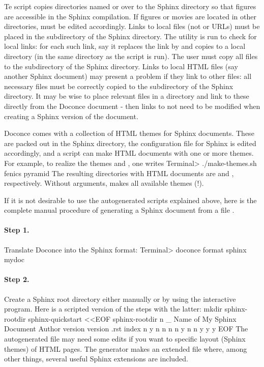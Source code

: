 \documentclass{book}
\begin{document}
Te  script copies directories named  or 
over to the Sphinx directory so that figures are accessible in the
Sphinx compilation.  If figures or movies are located in other
directories,  must be edited accordingly.
Links to local files (not  or  URLs) must be placed
in the  subdirectory of the Sphinx directory. The
utility  is run to check for local
links: for each such link, say  it replaces
the link by  and copies 
to a local  directory (in the same directory as the
script is run). The user must copy all  files to the
 subdirectory of the Sphinx directory. Links to local
HTML files (say another Sphinx document) may present a problem if they link
to other files: all necessary files must be correctly copied to
the  subdirectory of the Sphinx directory.
It may be wise to place relevant files in a  directory
and link to these directly from the Doconce document - then links
to not need to be modified when creating  a Sphinx version of
the document.

Doconce comes with a collection of HTML themes for Sphinx documents.
These are packed out in the Sphinx directory, the 
configuration file for Sphinx is edited accordingly, and a script
 can make HTML documents with one or more themes.
For example,
to realize the themes  and , one writes
\bsys
Terminal> ./make-themes.sh fenics pyramid
\esys
The resulting directories with HTML documents are 
and , respectively. Without arguments,
 makes all available themes (!).

If it is not desirable to use the autogenerated scripts explained
above, here is the complete manual procedure of generating a
Sphinx document from a file .

\paragraph{Step 1.}
Translate Doconce into the Sphinx format:
\bsys
Terminal> doconce format sphinx mydoc
\esys

\paragraph{Step 2.}
Create a Sphinx root directory
either manually or by using the interactive 
program. Here is a scripted version of the steps with the latter:
\bsys
mkdir sphinx-rootdir
sphinx-quickstart <<EOF
sphinx-rootdir
n
_
Name of My Sphinx Document
Author
version
version
.rst
index
n
y
n
n
n
n
y
n
n
y
y
y
EOF
\esys
The autogenerated  file
may need some edits if you want to specific layout (Sphinx themes)
of HTML pages. The  generator makes an extended 
file where, among other things, several useful Sphinx extensions
are included.
\end{document}
